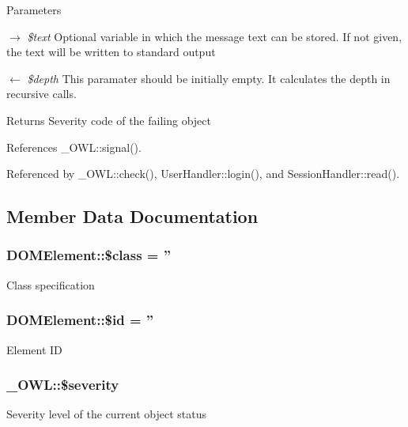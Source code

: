 \begin{DoxyParams}{Parameters}
\item[\mbox{$\rightarrow$} {\em \$text}]Optional variable in which the message text can be stored. If not given, the text will be written to standard output \item[\mbox{$\leftarrow$} {\em \$depth}]This paramater should be initially empty. It calculates the depth in recursive calls. \end{DoxyParams}
\begin{DoxyReturn}{Returns}
Severity code of the failing object 
\end{DoxyReturn}


References \_\-OWL::signal().



Referenced by \_\-OWL::check(), UserHandler::login(), and SessionHandler::read().



\subsection{Member Data Documentation}
\subsubsection[{\$class}]{\setlength{\rightskip}{0pt plus 5cm}DOMElement::\$class = ''}\label{classDOMElement_a5114a8be2c698c735ec897857156d252}
Class specification 
\subsubsection[{\$id}]{\setlength{\rightskip}{0pt plus 5cm}DOMElement::\$id = ''}\label{classDOMElement_a8b2176f3ade70abc7b41603618a992c0}
Element ID 
\subsubsection[{\$severity}]{\setlength{\rightskip}{0pt plus 5cm}\_\-OWL::\$severity}\label{class__OWL_ad26b40a9dbbacb33e299b17826f8327c}
Severity level of the current object status 
